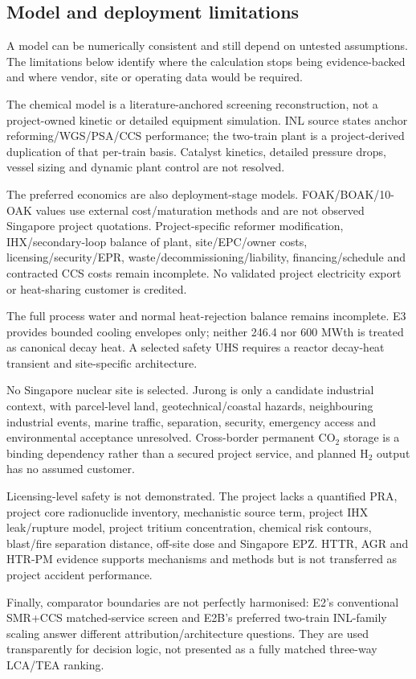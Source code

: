 \subsection{Model and deployment limitations}

A model can be numerically consistent and still depend on untested assumptions. The limitations below identify where the calculation stops being evidence-backed and where vendor, site or operating data would be required.

The chemical model is a literature-anchored screening reconstruction, not a project-owned kinetic or detailed equipment simulation. INL source states anchor reforming/WGS/PSA/CCS performance; the two-train plant is a project-derived duplication of that per-train basis. Catalyst kinetics, detailed pressure drops, vessel sizing and dynamic plant control are not resolved.

The preferred economics are also deployment-stage models. FOAK/BOAK/10-OAK values use external cost/maturation methods and are not observed Singapore project quotations. Project-specific reformer modification, IHX/secondary-loop balance of plant, site/EPC/owner costs, licensing/security/EPR, waste/decommissioning/liability, financing/schedule and contracted CCS costs remain incomplete. No validated project electricity export or heat-sharing customer is credited.

The full process water and normal heat-rejection balance remains incomplete. E3 provides bounded cooling envelopes only; neither 246.4 nor 600 MWth is treated as canonical decay heat. A selected safety UHS requires a reactor decay-heat transient and site-specific architecture.

No Singapore nuclear site is selected. Jurong is only a candidate industrial context, with parcel-level land, geotechnical/coastal hazards, neighbouring industrial events, marine traffic, separation, security, emergency access and environmental acceptance unresolved. Cross-border permanent CO$_2$ storage is a binding dependency rather than a secured project service, and planned H$_2$ output has no assumed customer.

Licensing-level safety is not demonstrated. The project lacks a quantified PRA, project core radionuclide inventory, mechanistic source term, project IHX leak/rupture model, project tritium concentration, chemical risk contours, blast/fire separation distance, off-site dose and Singapore EPZ. HTTR, AGR and HTR-PM evidence supports mechanisms and methods but is not transferred as project accident performance.

Finally, comparator boundaries are not perfectly harmonised: E2's conventional SMR+CCS matched-service screen and E2B's preferred two-train INL-family scaling answer different attribution/architecture questions. They are used transparently for decision logic, not presented as a fully matched three-way LCA/TEA ranking.
